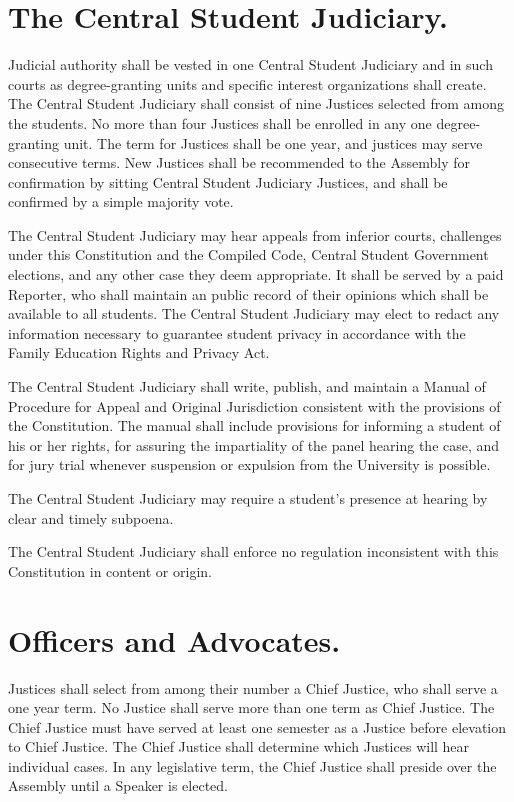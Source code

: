 \section{The Central Student Judiciary.}
    Judicial authority shall be vested in one Central Student Judiciary and in such courts as degree-granting units and specific interest organizations shall create. The Central Student Judiciary shall consist of nine Justices selected from among the students. No more than four Justices shall be enrolled in any one degree-granting unit. The term for Justices shall be one year, and justices may serve consecutive terms. New Justices shall be recommended to the Assembly for confirmation by sitting Central Student Judiciary Justices, and shall be confirmed by a simple majority vote.

    The Central Student Judiciary may hear appeals from inferior courts, challenges under this Constitution and the Compiled Code, Central Student Government elections, and any other case they deem appropriate. It shall be served by a paid Reporter, who shall maintain an public record of their opinions which shall be available to all students. The Central Student Judiciary may elect to redact any information necessary to guarantee student privacy in accordance with the Family Education Rights and Privacy Act.

   The Central Student Judiciary shall write, publish, and maintain a Manual of Procedure for Appeal and Original Jurisdiction consistent with the provisions of the Constitution. The manual shall include provisions for informing a student of his or her rights, for assuring the impartiality of the panel hearing the case, and for jury trial whenever suspension or expulsion from the University is possible.

    The Central Student Judiciary may require a student's presence at hearing by clear and timely subpoena.

    The Central Student Judiciary shall enforce no regulation inconsistent with this Constitution in content or origin.

\section{Officers and Advocates.}
    Justices shall select from among their number a Chief Justice, who shall serve a one year term. No Justice shall serve more than one term as Chief Justice. The Chief Justice must have served at least one semester as a Justice before elevation to Chief Justice. The Chief Justice shall determine which Justices will hear individual cases. In any legislative term, the Chief Justice shall preside over the Assembly until a Speaker is elected.


